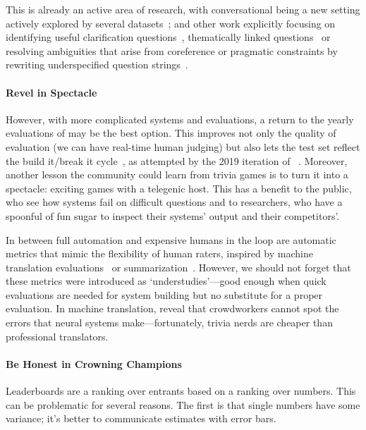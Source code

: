 This is already an active area of research, with conversational  being a new setting
actively explored by several datasets~\cite{reddy-18,choi-18}; and other work explicitly focusing on
identifying useful clarification questions~\cite{rao-2018}, thematically linked questions~\cite{elgohary-18} or resolving ambiguities that arise from
coreference or pragmatic constraints by rewriting underspecified question strings~\cite{elgohary-19,min-20}.

\paragraph{Revel in Spectacle}

However, with more complicated systems and evaluations, a return to the yearly evaluations of  may be the best option.
This improves not only the quality of evaluation (we can have real-time human judging) but also lets the test set reflect the build it/break it cycle~\cite{ruef-16}, as attempted by the 2019 iteration of ~\cite{thorne-19}.
Moreover, another lesson the  community could learn from
trivia games is to turn it into a spectacle: exciting games with a
telegenic host.
This has a benefit to the public, who see how  systems fail on difficult questions and to  researchers, who have a spoonful of fun sugar to inspect their systems' output and their competitors'.

In between full automation and expensive humans in the loop are automatic metrics that mimic the flexibility of human raters, inspired by machine translation evaluations~\cite{papineni-02,specia-10} or summarization~\cite{lin-04}. 
However, we should not forget
that these metrics were introduced as `understudies'---good enough when quick evaluations are needed for system
building but no substitute for a proper evaluation.
In machine translation,  reveal that crowdworkers cannot spot the errors that neural  systems make---fortunately, trivia nerds are cheaper than professional translators.

\paragraph{Be Honest in Crowning  Champions}

Leaderboards are a ranking over entrants based on a ranking over numbers.
This can be problematic for several reasons.
The first is that single numbers have some variance; it's better to communicate estimates with error bars.

